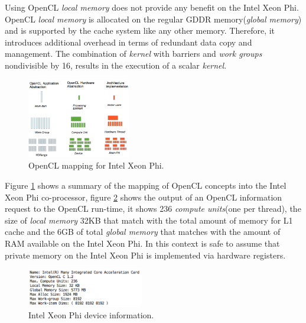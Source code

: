 \par{Using OpenCL \emph{local memory} does not provide any benefit on the Intel Xeon Phi. OpenCL \emph{local memory} is 
    allocated on the regular GDDR memory(\emph{global memory}) and is supported by the cache system like any other memory. 
    Therefore, it introduces additional overhead in terms of redundant data copy and management. The combination of \emph{kernel} 
    with barriers and \emph{work groups} nondivisible by 16, results in the execution of a scalar \emph{kernel}\cite{opencl_phi}.}

\begin{figure}[!h]
    \centering
    \includegraphics[width=0.4\textwidth]{figures/phi_model.png}
    \caption{OpenCL mapping for Intel Xeon Phi.}
    \label{PhiModel}
\end{figure}

\par{Figure \ref{PhiModel} shows a summary of the mapping of OpenCL concepts into the Intel Xeon Phi co-processor, figure 
    \ref{PhiDeviceInfo} shows the output of an OpenCL information request to the OpenCL run-time, it shows 236 
    \emph{compute units}(one per thread), the size of \emph{local memory} 32KB that match with the total amount of memory for L1 cache and
    the 6GB of total \emph{global memory} that matches with the amount of RAM available on the Intel Xeon Phi. In this context is 
    safe to assume that private memory on the Intel Xeon Phi is implemented via hardware registers.} 

\begin{figure}[!h]
    \centering
    \includegraphics[width=0.45\textwidth]{figures/phi_device_info.png}
    \caption{Intel Xeon Phi device information.}
    \label{PhiDeviceInfo}
\end{figure}



